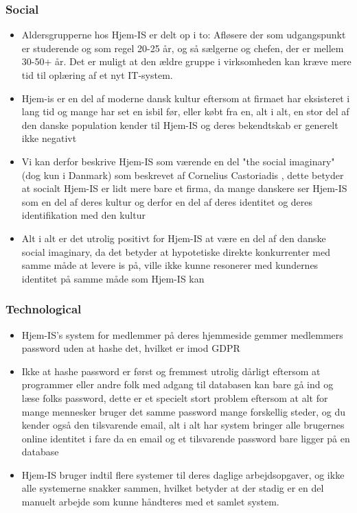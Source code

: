 \subsubsection{Social}
\begin{itemize}
    \item Aldersgrupperne hos Hjem-IS er delt op i to: Afløsere der som udgangspunkt er studerende og som regel 20-25 år, og så sælgerne og chefen, der er mellem 30-50+ år. Det er muligt at den ældre gruppe i virksomheden kan kræve mere tid til oplæring af et nyt IT-system.
    \item Hjem-is er en del af moderne dansk kultur eftersom at firmaet har eksisteret i lang tid og mange har set en isbil før, eller købt fra en, alt i alt, en stor del af den danske population kender til Hjem-IS og deres bekendtskab er generelt ikke negativt
    \item Vi kan derfor beskrive Hjem-IS som værende en del "the social imaginary" (dog kun i Danmark) som beskrevet af Cornelius Castoriadis \cite{Castoriadis1997imaginary}, dette betyder at socialt Hjem-IS er lidt mere bare et firma, da mange danskere ser Hjem-IS som en del af deres kultur og derfor en del af deres identitet og deres identifikation med den kultur
    \item Alt i alt er det utrolig positivt for Hjem-IS at være en del af den danske social imaginary, da det betyder at hypotetiske direkte konkurrenter med samme måde at levere is på, ville ikke kunne resonerer med kundernes identitet på samme måde som Hjem-IS kan
\end{itemize}
\subsubsection{Technological}
\begin{itemize}
    \item Hjem-IS’s system for medlemmer på deres hjemmeside gemmer medlemmers password uden at hashe det, hvilket er imod GDPR
    \item Ikke at hashe password er først og fremmest utrolig dårligt eftersom at programmer eller andre folk med adgang til databasen kan bare gå ind og læse folks password, dette er et specielt stort problem eftersom at alt for mange mennesker bruger det samme password mange forskellig steder, og du kender også den tilsvarende email, alt i alt har system bringer alle brugernes online identitet i fare da en email og et tilsvarende password bare ligger på en database
    \item Hjem-IS bruger indtil flere systemer til deres daglige arbejdsopgaver, og ikke alle systemerne snakker sammen, hvilket betyder at der stadig er en del manuelt arbejde som kunne håndteres med et samlet system.
\end{itemize}
